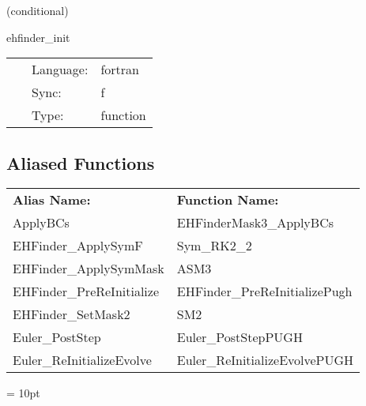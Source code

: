 \vspace{5mm}

   (conditional) 

\hspace{5mm} ehfinder\_init 

\hspace{5mm}{\it setup local variables } 


\hspace{5mm}

 \begin{tabular*}{160mm}{cll} 
~ & Language:  & fortran \\ 
~ & Sync:  & f \\ 
~ & Type:  & function \\ 
\end{tabular*} 


\subsection*{Aliased Functions}

\hspace{5mm}

 \begin{tabular*}{160mm}{ll} 

{\bf Alias Name:} ~~~~~~~ & {\bf Function Name:} \\ 
ApplyBCs & EHFinderMask3\_ApplyBCs \\ 
EHFinder\_ApplySymF & Sym\_RK2\_2 \\ 
EHFinder\_ApplySymMask & ASM3 \\ 
EHFinder\_PreReInitialize & EHFinder\_PreReInitializePugh \\ 
EHFinder\_SetMask2 & SM2 \\ 
Euler\_PostStep & Euler\_PostStepPUGH \\ 
Euler\_ReInitializeEvolve & Euler\_ReInitializeEvolvePUGH \\ 
\end{tabular*} 



\vspace{5mm}\parskip = 10pt 


